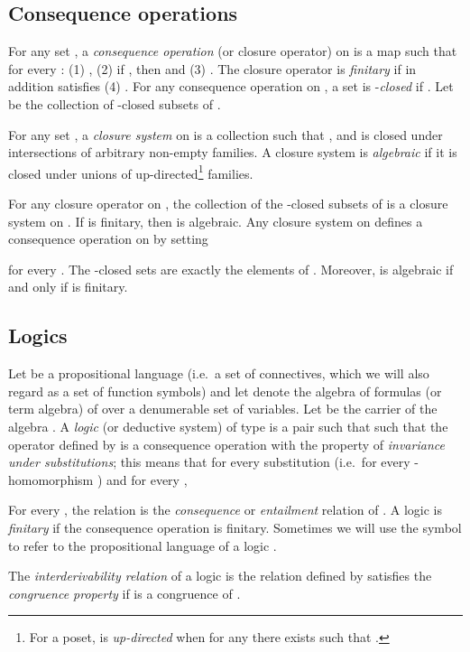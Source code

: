 \documentclass{llncs}
\numberwithin{equation}{section}
\begin{document}
\subsection{Consequence operations}
For any set , a \textit{consequence operation} (or closure operator) on   is a map  such that for every : (1) , (2) if , then  and (3) . The closure operator  is \textit{finitary} if in addition satisfies  (4) . For any consequence operation  on , a set  is -\textit{closed} if . Let  be the collection of -closed subsets of .

For any set , a \textit{closure system} on  is a collection  such that , and  is closed under intersections of arbitrary non-empty families. A closure system is \textit{algebraic} if it is closed under unions of up-directed\footnote{
For  a poset,  is  \emph{up-directed} when for any  there exists  such that . } families.

For any closure operator  on , the collection  of the -closed subsets of  is a closure system on . If  is finitary, then  is algebraic. Any closure system  on  defines a consequence operation  on  by setting

for every . The -closed sets are exactly the elements of . Moreover,  is algebraic if and only if  is finitary.

\subsection{Logics}\label{subsec:logics}
Let  be a propositional language (i.e.\ a set of connectives, which we will also regard as a set  of function symbols) and let  denote the algebra of formulas (or term algebra) of  over a denumerable  set  of variables. Let  be the carrier of the algebra . A \textit{logic} (or deductive system) of type  is a pair  such that  such that the operator  defined by  is a consequence operation with the property of  \textit{invariance under substitutions}; this means that for every substitution  (i.e.\ for every -homomorphism ) and for every ,



For every , the relation  is the {\em consequence} or {\em entailment} relation of . A logic is \textit{finitary} if the consequence operation  is finitary. Sometimes we will use the symbol  to refer to the propositional language of a logic .

The  \textit{interderivability relation} of a logic   is the relation  defined by   satisfies the \textit{congruence property} if  is a congruence of .
\end{document}
